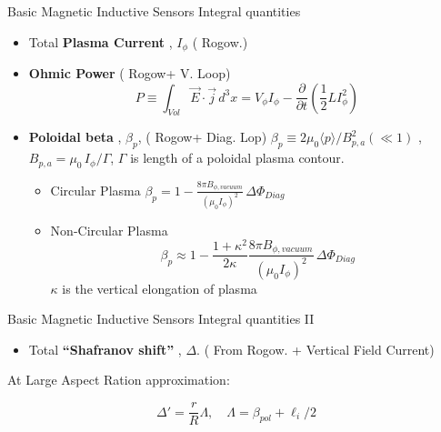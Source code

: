 \documentclass{beamer}
\begin{document}
\begin{frame}{Basic Magnetic Inductive Sensors } { Integral  quantities}
   \begin{itemize}
 	\item Total \textbf{ Plasma Current }, $I_\phi$  ( Rogow.)
	\item  \textbf{ Ohmic Power}  ( Rogow+ V. Loop)
	$$P \equiv \int_{Vol} \vec{E} \cdot \vec{j}\, d^3 x = V_\phi I_\phi - \frac{\partial}{\partial t} (\frac{1}{2} L I_\phi^2 ) $$

	\item \textbf{ Poloidal beta }, $\beta_p $,  ( Rogow+ Diag. Lop)
	 $	\beta_p \equiv 2 \mu_0 \langle p \rangle  / B_{p,a}^2 ( \ll 1)$ , $B_{p,a} = \mu_0\, I_\phi / \Gamma $,  $ \Gamma$ is length of a poloidal plasma contour.
   	\begin{itemize}
 		\item Circular Plasma $  \beta_p = 1 - \frac{8 \pi B_{\phi, vacuum}}{(\mu_0 I_\phi)^2} \, \Delta \Phi_{Diag} $
	 	\item Non-Circular Plasma
		$$  \beta_p  \approx  1  - \frac{1 +\kappa^2}{2 \kappa}  \frac{8 \pi B_{\phi, vacuum}}{(\mu_0 I_\phi)^2} \, \Delta \Phi_{Diag}$$
		$\kappa$ is the vertical elongation of plasma
	    \end{itemize}
     \end{itemize}
\end{frame}


\begin{frame}{Basic Magnetic Inductive Sensors } {Integral  quantities II}
   \begin{itemize}
 	\item Total \textbf{“Shafranov shift” }, $\Delta$.  ( From Rogow. + Vertical Field Current)
     \end{itemize} At Large Aspect Ration approximation:

$$\Delta' = \frac{r}{R} \Lambda, \quad \Lambda=\beta_{pol} + \ell_i /2$$
	\begin{center}
	\end{center}
\end{frame}
\end{document}

